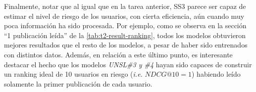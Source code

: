\begin{itemize}
    Finalmente, notar que al igual que en la tarea anterior, SS3 parece ser capaz de estimar el nivel de riesgo de los usuarios, con cierta eficiencia, aún cuando muy poca información ha sido procesada.
    Por ejemplo, como se observa en la sección ``1 publicación leída'' de la \autoref{tab:t2-result-ranking},
    todos los modelos obtuvieron mejores resultados que el resto de los modelos, a pesar de haber sido entrenados con distintos datos.
    Además, en relación a este último punto, es interesante destacar el hecho que los modelos \emph{UNSL\#3 y \#4} hayan sido capaces de construir un ranking ideal de 10 usuarios en riesgo (\emph{i.e.} $NDCG@10 = 1$) habiendo leído solamente la primer publicación de cada usuario.


\end{itemize}






